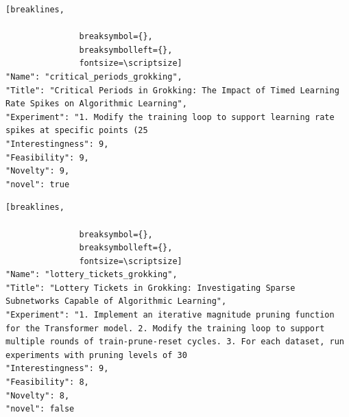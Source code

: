 \begin{tcolorbox}[
  breakable,
  colback  = blue!5!white,
  colframe = blue!75!black,
  title    = {Idea 19/50 - \texttt{critical\_periods\_grokking}},
  fontupper=\scriptsize\ttfamily,
]
\begin{Verbatim}[breaklines,

               breaksymbol={},
               breaksymbolleft={},
               fontsize=\scriptsize]
"Name": "critical_periods_grokking",
"Title": "Critical Periods in Grokking: The Impact of Timed Learning Rate Spikes on Algorithmic Learning",
"Experiment": "1. Modify the training loop to support learning rate spikes at specific points (25
"Interestingness": 9,
"Feasibility": 9,
"Novelty": 9,
"novel": true
\end{Verbatim}
\end{tcolorbox}

\begin{tcolorbox}[
  breakable,
  colback  = blue!5!white,
  colframe = blue!75!black,
  title    = {Idea 20/50 - \texttt{lottery\_tickets\_grokking}},
  fontupper=\scriptsize\ttfamily,
]
\begin{Verbatim}[breaklines,

               breaksymbol={},
               breaksymbolleft={},
               fontsize=\scriptsize]
"Name": "lottery_tickets_grokking",
"Title": "Lottery Tickets in Grokking: Investigating Sparse Subnetworks Capable of Algorithmic Learning",
"Experiment": "1. Implement an iterative magnitude pruning function for the Transformer model. 2. Modify the training loop to support multiple rounds of train-prune-reset cycles. 3. For each dataset, run experiments with pruning levels of 30
"Interestingness": 9,
"Feasibility": 8,
"Novelty": 8,
"novel": false
\end{Verbatim}
\end{tcolorbox}

